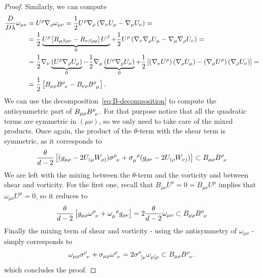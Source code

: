\begin{proof}
	\noindent Similarly, we can compute
	\small{
	\begin{align*}
		\frac{D}{D\lambda}\omega_{\mu\nu} &= U^{\rho}\nabla_{\rho}\omega_{\mu\nu} = \frac{1}{2}U^{\rho}\nabla_{\rho}\left( \nabla_{\nu}U_{\mu} - \nabla_{\mu}U_{\nu} \right) = \\
		&= \frac{1}{2}\underbrace{U^{\rho} \left[R_{\mu\beta\rho\nu} - R_{\nu\beta\rho\mu}\right]U^{\beta}}_{0} + \frac{1}{2}U^{\rho}\left(\nabla_{\nu}\nabla_{\rho}U_{\mu} - \nabla_{\mu}\nabla_{\rho}U_{\nu}\right) = \\
		&= \frac{1}{2} \nabla_{\nu}\underbrace{\left( U^{\rho} \nabla_{\rho}U_{\mu}\right)}_{0} -  \frac{1}{2} \nabla_{\mu}\underbrace{\left( U^{\rho} \nabla_{\rho}U_{\nu}\right)}_{0} + \frac{1}{2}\left[\left(\nabla_{\nu}U^{\rho}\right)\left(\nabla_{\rho}U_{\mu}\right) - \left(\nabla_{\mu}U^{\rho}\right)\left(\nabla_{\rho}U_{\nu}\right) \right] =\\
		&= \frac{1}{2} \left[B_{\mu\rho}B\indices{^{\rho}_{\nu}} - B_{\nu\rho}B\indices{^{\rho}_{\mu}} \right].
	\end{align*}
	}
	We can use the decomposition~\ref{eq:B-decomposition} to compute the antisymmetric part of \(B_{\mu\rho}B\indices{^{\rho}_{\nu}}\). For that purpose notice that all the quadratic terms are symmetric in \((\mu\nu)\), so we only need to take care of the mixed products. Once again, the product of the \(\theta\)-term with the shear term is symmetric, as it corresponds to
	\[
	\frac{\theta}{d - 2}\left[(g_{\mu\rho} - 2U_{(\mu}W_{\rho)}) \sigma\indices{^{\rho}_{\nu}} + \sigma\indices{_{\mu}^{\rho}}(g_{\rho\nu} - 2U_{(\rho}W_{\nu)})\right] \subset B_{\mu\rho}B\indices{^{\rho}_{\nu}}
	\]
	We are left with the mixing between the \(\theta\)-term and the vorticity and between shear and vorticity. For the first one, recall that \(B_{\mu\nu}U^{\nu} = 0 = B_{\mu\nu}U^{\mu}\) implies that \(\omega_{\mu\nu}U^{\mu} = 0\), so it reduces to
	\[
	\frac{\theta}{d - 2}\left[g_{\mu\rho}\omega\indices{^{\rho}_{\nu}} + \omega\indices{_{\mu}^{\rho}}g_{\rho\nu}\right] = 2 \frac{\theta}{d -2}\omega_{\mu\nu} \subset B_{\mu\rho}B\indices{^{\rho}_{\nu}}
	\]
	Finally the mixing term of shear and vorticity - using the antisymmetry of \(\omega_{\mu\nu}\) - simply corresponds to 
	\[
	\omega_{\mu\rho} \sigma\indices{^{\rho}_{\nu}} + \sigma_{\mu\rho} \omega\indices{^{\rho}_{\nu}} = 2 \sigma\indices{^{\rho}_{[\nu}}\omega\indices{_{\mu]\rho}} \subset B_{\mu\rho}B\indices{^{\rho}_{\nu}}.
	\]
	which concludes the proof.
\end{proof}
	
